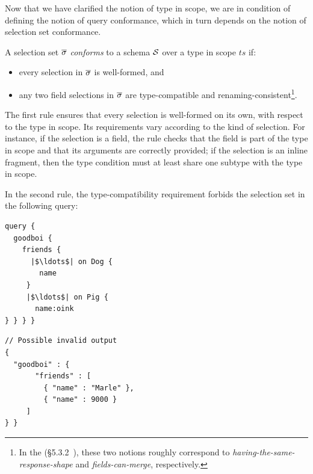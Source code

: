 
Now that we have clarified the notion of type in scope, we are in
condition of defining the notion of query conformance, which in turn
depends on the notion of selection set conformance.

\begin{definition}
A \gql selection set $\overline{\sigma}$ \textit{conforms} to a schema $\mathcal{S}$ over a type in scope $\mathit{ts}$ if:
\begin{itemize}
\item every selection in $\overline{\sigma}$ is  well-formed, and

\item any two field selections in $\overline{\sigma}$ are type-compatible and
  renaming-consistent\footnote{In the \spec
    (\cf\S5.3.2~\cite{gqlspec}), these two notions roughly correspond
    to \emph{having-the-same-response-shape} and
    \emph{fields-can-merge}, respectively.}.
       
\end{itemize}
\end{definition}

The first rule ensures that every selection is well-formed on its own, with
respect to the type in scope. Its requirements vary according to the
kind of selection. For instance, if the selection is a field, the rule
checks that the field is part of the type in scope and that its
arguments are correctly provided; if the selection is an inline
fragment, then the type condition must at least share one subtype with
the type in scope.


In the second rule, the type-compatibility requirement forbids the
selection set in \eg the following query:

\begin{minipage}[t]{.22\textwidth}
\begin{verbatim}
query {
  goodboi {
    friends {
      |$\ldots$| on Dog {
        name
     }
     |$\ldots$| on Pig {
       name:oink
} } } }
\end{verbatim}
\end{minipage}%
\begin{minipage}[t]{.22\textwidth}
\begin{verbatim}
// Possible invalid output
{
  "goodboi" : {
       "friends" : [
         { "name" : "Marle" },
         { "name" : 9000 }
     ]
} }
\end{verbatim}
\end{minipage}

